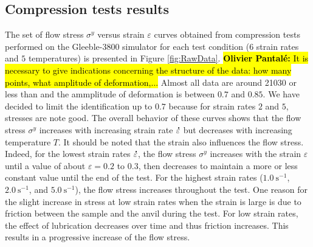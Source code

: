 \documentclass[twoside,english,1p,final,sort&compress]{elsarticle}
\theoremstyle{plain}
\DeclareRobustCommand{\mdot}[1]{\accentset{\mbox{\bfseries .}}{#1}}
\DeclareRobustCommand{\ps}{\text{s}^{-1}}
\DeclareRobustCommand{\OP}[1]{ {\begingroup\sethlcolor{VWyellow}\textcolor{red}{\hl{\textbf{Olivier Pantal\'e:} #1}}\endgroup} }
\begin{document}
\subsection{Compression tests results\label{sec:ComTestResults}}

The set of flow stress $\sigma^y$ versus strain $\varepsilon$ curves obtained from compression tests performed on the Gleeble-3800 simulator for each test condition ($6$ strain rates and $5$ temperatures) is presented in Figure \ref{fig:RawData}.
\OP{It is necessary to give indications concerning the structure of the data: how many points, what amplitude of deformation,...}
Almost all data are around 21030 or less than and the ammplitude of deformation is between $0.7$ and $0.85$.
We have decided to limit the identification up to $0.7$ because for strain rates $2$ and $5$, stresses are note good.
The overall behavior of these curves shows that the flow stress $\sigma^y$ increases with increasing strain rate $\mdot\varepsilon$ but decreases with increasing temperature $T$.
It should be noted that the strain also influences the flow stress.
Indeed, for the lowest strain rates $\mdot\varepsilon$, the flow stress $\sigma^y$ increases with the strain $\varepsilon$ until a value of about $\varepsilon=0.2$ to $0.3$, then decreases to maintain a more or less constant value until the end of the test.
For the highest strain rates ($1.0~\ps$, $2.0~\ps$, and $5.0~\ps$), the flow stress increases throughout the test.
One reason for the slight increase in stress at low strain rates when the strain is large is due to friction between the sample and the anvil during the test.
For low strain rates, the effect of lubrication decreases over time and thus friction increases.
This results in a progressive increase of the flow stress.
\end{document}
